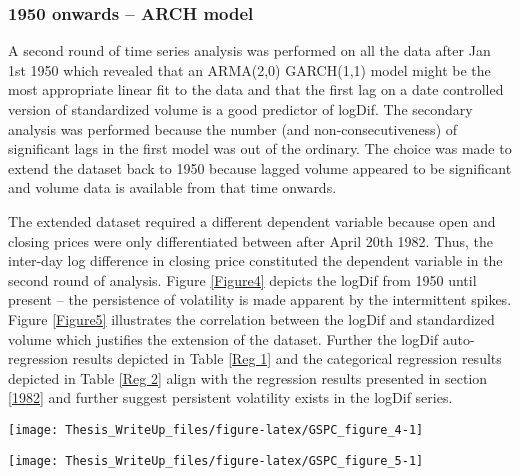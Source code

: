\documentclass[11pt,preprint, authoryear]{elsarticle}
\let\origfigure\figure
\let\endorigfigure\endfigure
\renewenvironment{figure}[1][2] {
    \expandafter\origfigure\expandafter[H]
} {
    \endorigfigure
}
\numberwithin{equation}{section}
\numberwithin{figure}{section}
\numberwithin{table}{section}
\begin{document}
\hypertarget{onwards-arch-model}{%
\subsubsection{1950 onwards -- ARCH model}\label{onwards-arch-model}}

A second round of time series analysis was performed on all the data
after Jan 1st 1950 which revealed that an ARMA(2,0) GARCH(1,1) model
might be the most appropriate linear fit to the data and that the first
lag on a date controlled version of standardized volume is a good
predictor of logDif. The secondary analysis was performed because the
number (and non-consecutiveness) of significant lags in the first model
was out of the ordinary. The choice was made to extend the dataset back
to 1950 because lagged volume appeared to be significant and volume data
is available from that time onwards.

The extended dataset required a different dependent variable because
open and closing prices were only differentiated between after April
20th 1982. Thus, the inter-day log difference in closing price
constituted the dependent variable in the second round of analysis.
Figure \ref{Figure4} depicts the logDif from 1950 until present -- the
persistence of volatility is made apparent by the intermittent spikes.
Figure \ref{Figure5} illustrates the correlation between the logDif and
standardized volume which justifies the extension of the dataset.
Further the logDif auto-regression results depicted in Table \ref{Reg 1}
and the categorical regression results depicted in Table \ref{Reg 2}
align with the regression results presented in section \ref{1982} and
further suggest persistent volatility exists in the logDif series.

\begin{figure}[H]

{\centering \texttt{[image: Thesis\_WriteUp\_files/figure-latex/GSPC\_figure\_4-1]} 

}

\caption{SandP 500 Closing Price Log Difference 1950 – 2022 \label{Figure4}}\label{fig:GSPC_figure_4}
\end{figure}

\begin{figure}[H]

{\centering \texttt{[image: Thesis\_WriteUp\_files/figure-latex/GSPC\_figure\_5-1]} 

}

\caption{Standardized volume (red) and absolute logDiff (green) \label{Figure5}}\label{fig:GSPC_figure_5}
\end{figure}
\end{document}
